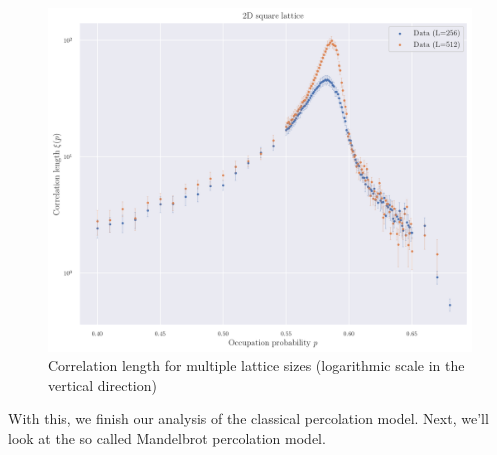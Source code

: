 \begin{figure}[H]
  \includegraphics[width=\linewidth]{Images/sim_corr_length_1.png}
  \caption{Correlation length for multiple lattice sizes (logarithmic scale in the vertical direction)}
  \label{fig:sim_corr_length_1}
\end{figure}
    

With this, we finish our analysis of the classical percolation model. Next, we'll look at the so called Mandelbrot percolation model.



\clearpage
